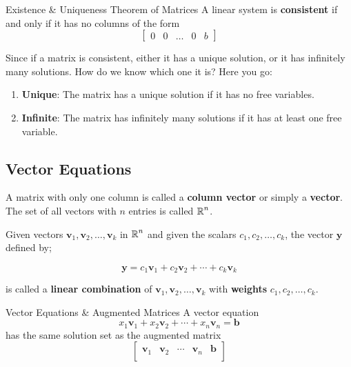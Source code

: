 \documentclass{article}
\begin{document}
\begin{theorem}{Existence \& Uniqueness Theorem of Matrices}
	A linear system is \textbf{consistent} if and only if it has no columns of the form
	$$
		\begin{bmatrix} 0 & 0 & \ldots & 0 & b \end{bmatrix}
	$$

	Since if a matrix is consistent, either it has a unique solution, or it has infinitely many solutions. How do we know which one it is? Here you go:
	\begin{enumerate}[label=\alph*)]
		\item \textbf{Unique}:
		      The matrix has a unique solution if it has no free variables.
		\item \textbf{Infinite}:
		      The matrix has infinitely many solutions if it has at least one free variable.
	\end{enumerate}
\end{theorem}

\subsection{Vector Equations}
A matrix with only one column is called a \textbf{column vector} or simply a \textbf{vector}. The set of all vectors with $n$ entries is called $\operatorname{\mathbb{R}}^n$.

Given vectors $\mathbf{v}_1, \mathbf{v}_2, \ldots, \mathbf{v}_k$ in $\operatorname{\mathbb{R}}^n$ and given the scalars $c_1, c_2, \ldots, c_k$, the vector $\mathbf{y}$ defined by;

\begin{equation}
	\mathbf{y} = c_1\mathbf{v}_1 + c_2\mathbf{v}_2 + \cdots + c_k\mathbf{v}_k
\end{equation}

is called a \textbf{linear combination} of $\mathbf{v}_1, \mathbf{v}_2, \ldots, \mathbf{v}_k$ with \textbf{weights} $c_1, c_2, \ldots, c_k$.

\begin{remark}{Vector Equations \& Augmented Matrices}
	A vector equation
	$$
		x_1\mathbf{v}_1 + x_2\mathbf{v}_2 + \cdots + x_n\mathbf{v}_n = \mathbf{b}
	$$
	has the same solution set as the augmented matrix
	$$
		\begin{bmatrix}
			\mathbf{v}_1 & \mathbf{v}_2 & \cdots & \mathbf{v}_n & \mathbf{b} \\
		\end{bmatrix}
	$$
\end{remark}
\end{document}
